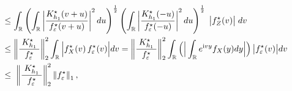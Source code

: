 \documentclass[11pt,a4paper,openany]{article}
\def\R{\mathbb{R}}
\begin{document}
\begin{align*}
	\\
	& \leq  \int_{\R}  \left(  \int_{\R} \left|  \dfrac{ K_{h_{1}}^{\star}(v+u) }{ f_{\varepsilon}^{\star}(v+u) }  \right|^{2}  du  \right)^{\frac{1}{2}}   \left(  \int_{\R} \left|  \dfrac{ K_{h_{1}}^{\star}(-u) }{ f_{\varepsilon}^{\star}(-u) }  \right|^{2}  du  \right)^{\frac{1}{2}}   \hspace{0.1cm}  \big|  f_{Z}^{\star}(v) \big|   \hspace{0.1cm} dv  
	\\
	&\leq \left\| \dfrac{ \hspace{0.1cm}     K_{h_{1}}^{\star} \hspace{0.1cm}   }{ f_{\varepsilon}^{\star} }   \right\|_{2}^{2}   \int_{\R}   \Big|  f_{X}^{\star}(v)  \,    f_{\varepsilon}^{\star}(v) \Big| dv
		=  \left\| \dfrac{ \hspace{0.1cm}     K_{h_{1}}^{\star} \hspace{0.1cm}   }{ f_{\varepsilon}^{\star} }   \right\|_{2}^{2}  \int_{\R}   \Big( \Big| \int_{\R} e^{\mathrm{i} vy} f_{X}(y)  dy  \Big|   \Big)  \, \big|  f_{\varepsilon}^{\star}(v) \big| dv \\
	& \leq     \hspace{0.1cm} \left\| \dfrac{ \hspace{0.1cm}     K_{h_{1}}^{\star} \hspace{0.1cm}   }{ f_{\varepsilon}^{\star} }   \right\|_{2}^{2}  \left\| f_{\varepsilon}^{\star} \right\|_{1},
\end{align*}
\end{document}
